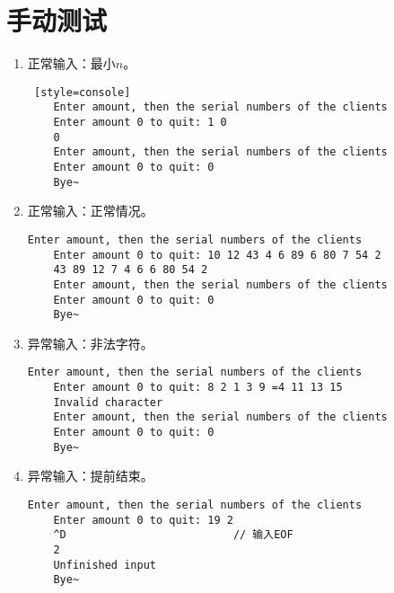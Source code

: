 \section{手动测试}

\begin{enumerate}
    \item 正常输入：最小$n$。
\begin{lstlisting} [style=console]
    Enter amount, then the serial numbers of the clients
    Enter amount 0 to quit: 1 0
    0 
    Enter amount, then the serial numbers of the clients
    Enter amount 0 to quit: 0
    Bye~
\end{lstlisting}
    \item 正常输入：正常情况。
\begin{lstlisting}[style=console]
    Enter amount, then the serial numbers of the clients
    Enter amount 0 to quit: 10 12 43 4 6 89 6 80 7 54 2
    43 89 12 7 4 6 6 80 54 2 
    Enter amount, then the serial numbers of the clients
    Enter amount 0 to quit: 0
    Bye~
\end{lstlisting}
    \item 异常输入：非法字符。
\begin{lstlisting}[style=console]
    Enter amount, then the serial numbers of the clients
    Enter amount 0 to quit: 8 2 1 3 9 =4 11 13 15
    Invalid character
    Enter amount, then the serial numbers of the clients
    Enter amount 0 to quit: 0
    Bye~
\end{lstlisting}
    \item 异常输入：提前结束。
\begin{lstlisting}[style=console]
    Enter amount, then the serial numbers of the clients
    Enter amount 0 to quit: 19 2
    ^D                          // 输入EOF
    2 
    Unfinished input
    Bye~
\end{lstlisting}
\end{enumerate}

